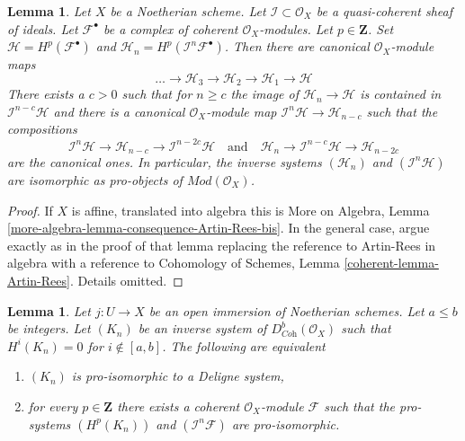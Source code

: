 \documentclass{stacks-project}
\theoremstyle{plain}
\newtheorem{lemma}[subsection]{Lemma}
\theoremstyle{definition}
\theoremstyle{remark}
\numberwithin{equation}{subsection}
\begin{document}
\begin{lemma}
\label{lemma-consequence-Artin-Rees-bis}
Let $X$ be a Noetherian scheme. Let $\mathcal{I} \subset \mathcal{O}_X$
be a quasi-coherent sheaf of ideals. Let $\mathcal{F}^\bullet$ be a
complex of coherent $\mathcal{O}_X$-modules. Let $p \in \mathbf{Z}$.
Set $\mathcal{H} = H^p(\mathcal{F}^\bullet)$ and
$\mathcal{H}_n = H^p(\mathcal{I}^n\mathcal{F}^\bullet)$.
Then there are canonical $\mathcal{O}_X$-module maps
$$
\ldots \to \mathcal{H}_3 \to \mathcal{H}_2 \to \mathcal{H}_1 \to \mathcal{H}
$$
There exists a $c > 0$ such that for $n \geq c$ the image of
$\mathcal{H}_n \to \mathcal{H}$ is contained in
$\mathcal{I}^{n - c}\mathcal{H}$ and there is a canonical
$\mathcal{O}_X$-module map
$\mathcal{I}^n\mathcal{H} \to \mathcal{H}_{n - c}$ such that the compositions
$$
\mathcal{I}^n \mathcal{H} \to \mathcal{H}_{n - c} \to
\mathcal{I}^{n - 2c}\mathcal{H}
\quad\text{and}\quad
\mathcal{H}_n \to \mathcal{I}^{n - c}\mathcal{H} \to \mathcal{H}_{n - 2c}
$$
are the canonical ones. In particular, the inverse systems
$(\mathcal{H}_n)$ and $(\mathcal{I}^n\mathcal{H})$
are isomorphic as pro-objects of $\textit{Mod}(\mathcal{O}_X)$.
\end{lemma}

\begin{proof}
If $X$ is affine, translated into algebra this is More on Algebra, Lemma
\ref{more-algebra-lemma-consequence-Artin-Rees-bis}.
In the general case, argue exactly as in the proof of that lemma
replacing the reference to Artin-Rees in algebra with a reference to
Cohomology of Schemes, Lemma \ref{coherent-lemma-Artin-Rees}.
Details omitted.
\end{proof}

\begin{lemma}
\label{lemma-characterize-extension-by-zero-algebra}
Let $j : U \to X$ be an open immersion of Noetherian schemes.
Let $a \leq b$ be integers. Let $(K_n)$ be an inverse system of
$D^b_{\textit{Coh}}(\mathcal{O}_X)$
such that $H^i(K_n) = 0$ for $i \not \in [a, b]$.
The following are equivalent
\begin{enumerate}
\item $(K_n)$ is pro-isomorphic to a Deligne system,
\item for every $p \in \mathbf{Z}$ there exists a coherent
$\mathcal{O}_X$-module $\mathcal{F}$ such that the pro-systems
$(H^p(K_n))$ and $(\mathcal{I}^n\mathcal{F})$ are pro-isomorphic.
\end{enumerate}
\end{lemma}
\end{document}
